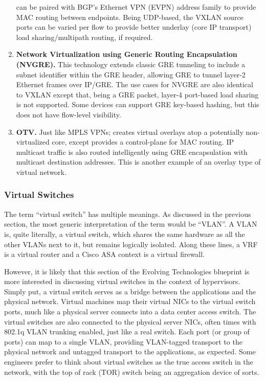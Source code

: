 \begin{enumerate}
  can be paired with BGP’s Ethernet VPN (EVPN) address family to provide MAC
  routing between endpoints. Being UDP-based, the VXLAN source ports can be
  varied per flow to provide better underlay (core IP transport) load
  sharing/multipath routing, if required.
  \item \textbf{Network Virtualization using Generic Routing Encapsulation
  (NVGRE).} This technology extends classic GRE tunneling to include a subnet
  identifier within the GRE header, allowing GRE to tunnel layer-2 Ethernet
  frames over IP/GRE\@. The use cases for NVGRE are also identical to VXLAN
  except that, being a GRE packet, layer-4 port-based load sharing is not
  supported. Some devices can support GRE key-based hashing, but this does not
  have flow-level visibility.
  \item \textbf{OTV.} Just like MPLS VPNs; creates virtual overlays atop a
  potentially non-virtualized core, except provides a control-plane for MAC
  routing. IP multicast traffic is also routed intelligently using GRE
  encapsulation with multicast destination addresses. This is another example
  of an overlay type of virtual network.
\end{enumerate}

\subsubsection{Virtual Switches}
The term ``virtual switch'' has multiple meanings. As discussed in the previous
section, the most generic interpretation of the term would be ``VLAN''. A VLAN
is, quite literally, a virtual switch, which shares the same hardware as all
the other VLANs next to it, but remains logically isolated. Along these lines,
a VRF is a virtual router and a Cisco ASA context is a virtual firewall.

However, it is likely that this section of the Evolving Technologies blueprint
is more interested in discussing virtual switches in the context of
hypervisors. Simply put, a virtual switch serves as a bridge between the
applications and the physical network. Virtual machines map their virtual NICs
to the virtual switch ports, much like a physical server connects into a data
center access switch. The virtual switches are also connected to the physical
server NICs, often times with 802.1q VLAN trunking enabled, just like a real
switch. Each port (or group of ports) can map to a single VLAN, providing
VLAN-tagged transport to the physical network and untagged transport to the
applications, as expected. Some engineers prefer to think about virtual
switches as the true access switch in the network, with the top of rack (TOR)
switch being an aggregation device of sorts.

